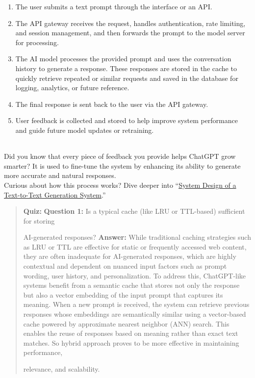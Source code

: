 \begin{enumerate}
\item
\protect{}\label{8mzZKsWPmt-KID0i4ItoU}
The user submits a text prompt through the interface or an API.
\item
\protect{}\label{Sak06VfIkPWCQn8XOJVdB}
The API gateway receives the request, handles authentication, rate limiting, and session management, and then forwards the prompt to the model server for processing.
\item
\protect{}\label{XdnYQP84keYArQY-qheYY}
The AI model processes the provided prompt and uses the conversation history to generate a response. These responses are stored in the cache to quickly retrieve repeated or similar requests and saved in the database for logging, analytics, or future reference.
\item
\protect{}\label{KDaxn3jT7v4PSz4UbkMMA}
The final response is sent back to the user via the API gateway.
\item
\protect{}\label{-V-720nrq0v6LmbPf_GEv}
User feedback is collected and stored to help improve system performance and guide future model updates or retraining.
\end{enumerate}
\\
Did you know that every piece of feedback you provide helps ChatGPT grow smarter? It is used to fine-tune the system by enhancing its ability to generate more accurate and natural responses.
\\
Curious about how this process works? Dive deeper into ``\href{https://www.educative.io/courses/generative-ai-system-design/deploying-the-system-design-of-a-text-to-text-generation-system}{System Design of a Text-to-Text Generation System}.''

\begin{quote}
\textbf{Quiz:}
\textbf{Question 1:} Is a typical cache (like LRU or TTL-based) sufficient for storing

AI-generated responses?
\textbf{Answer:} While traditional caching strategies such as LRU or TTL are effective for static or frequently accessed web content, they are often inadequate for AI-generated responses, which are highly contextual and dependent on nuanced input factors such as prompt wording, user history, and personalization. To address this, ChatGPT-like systems benefit from a semantic cache that stores not only the response but also a vector embedding of the input prompt that captures its meaning. When a new prompt is received, the system can retrieve previous responses whose embeddings are semantically similar using a vector-based cache powered by approximate nearest neighbor (ANN) search. This enables the reuse of responses based on meaning rather than exact text matches. So hybrid approach proves to be more effective in maintaining performance,

relevance, and scalability.
\end{quote}

